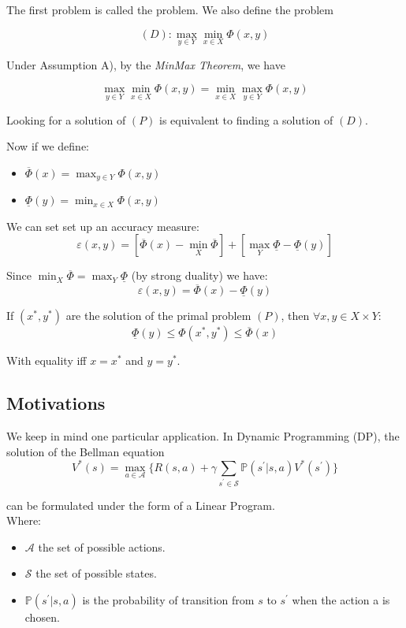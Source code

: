 \documentclass[12pt,reqno]{amsart}
\numberwithin{equation}{section}
\begin{document}
The first problem is called the  problem. We also define the  problem

$$
(D): \max_{y \in Y}\min_{x \in X} \Phi(x,y)
$$

Under Assumption A), by the \emph{MinMax Theorem}, we have 

$$
\max_{y \in Y}\min_{x \in X} \Phi(x,y) = \min_{x \in X}\max_{y \in Y} \Phi(x,y)
$$

Looking for a solution of $(P)$ is equivalent to finding a solution of $(D)$.

Now if we define:
\begin{itemize}
\item $\overline{\Phi}(x) = \max_{y \in Y}\Phi(x,y)$
\item $\underline{\Phi}(y) = \min_{x \in X}\Phi(x,y)$
\end{itemize}



We can set set up  an accuracy measure:
$$
\boxed{ \varepsilon(x,y) = [\overline{\Phi}(x) - \min_{X}\overline{\Phi}] + [\max_{Y}\underline{\Phi} - \underline{\Phi}(y)] }
$$

Since $\min_{X}\overline{\Phi} = \max_{Y}\underline{\Phi}$ (by  strong duality) we have:
$$
\boxed{\varepsilon(x,y) = \overline{\Phi}(x) - \underline{\Phi}(y)}
$$

If $(x^{*},y^{*})$ are the solution of the primal problem $(P)$,
then $\forall x, y \in X \times Y$:
$$
\underline{\Phi}(y) \leq \Phi(x^{*},y^{*}) \leq \overline{\Phi}(x)
$$

With equality iff $x = x^{*}$ and $y = y^{*}$.

\subsection{Motivations}

We keep in mind one particular application.
In Dynamic Programming (DP), the solution of the Bellman equation
$$
V^{*}(s) = \max_{a \in \mathcal{A}} \{ R(s,a) + \gamma \sum_{s^{'} \in \mathcal{S}} \mathbb{P}(s^{'} | s,a)V^{*}(s^{'}) \}
$$

can be formulated under the form of a Linear Program.\\

Where:
\begin{itemize}
\item $\mathcal{A}$ the set of possible actions.
\item $\mathcal{S}$ the set of possible states.
\item $\mathbb{P}(s^{'} | s,a)$ is the probability of transition from $s$ to $s^{'}$ when the action a is chosen.
\end{itemize}
\end{document}
